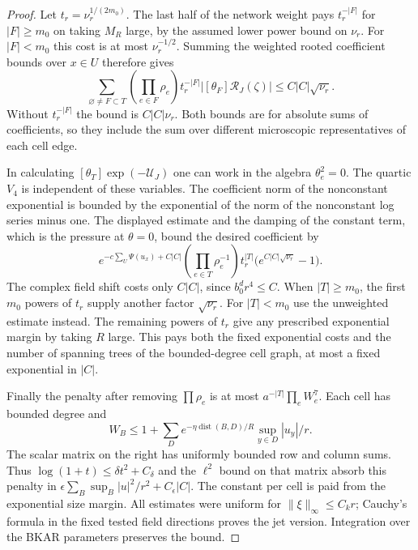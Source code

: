 \documentclass[11pt]{article}
\theoremstyle{definition}
\begin{document}
\begin{proof}
Let \(t_r=\nu_r^{1/(2m_0)}\). The last half of the network
weight pays \(t_r^{-|F|}\) for \(|F|\ge m_0\) on taking
\(M_R\) large, by the assumed lower power bound on \(\nu_r\).
For \(|F|<m_0\) this cost is at most \(\nu_r^{-1/2}\).
Summing the weighted rooted coefficient bounds over \(x\in U\)
therefore gives
\begin{equation}
 \sum_{\varnothing\ne F\subset T}
  \left(\prod_{e\in F}\rho_e\right)t_r^{-|F|}
          |[\theta_F]\mathcal R_J(\zeta)|
       \le C |C|\sqrt{\nu_r}.
\end{equation}
Without \(t_r^{-|F|}\) the bound is \(C|C|\nu_r\).
Both bounds are for absolute sums of coefficients, so they
include the sum over different microscopic representatives
of each cell edge.

In calculating \([\theta_T]\exp(-\mathcal U_J)\) one can work
in the algebra \(\theta_e^2=0\). The quartic \(V_4\) is independent
of these variables. The coefficient norm of the nonconstant
exponential is bounded by the exponential of the norm of the
nonconstant log series minus one. The displayed estimate and
the damping of the constant term, which is the pressure at
\(\theta=0\), bound the desired coefficient by
\begin{equation}
 e^{-c\sum_U\Psi(u_x)+C|C|}
    \left(\prod_{e\in T}\rho_e^{-1}\right)
    t_r^{|T|}\bigl(e^{C|C|\sqrt{\nu_r}}-1\bigr).
\end{equation}
The complex field shift costs only \(C|C|\), since
\(b_0^d r^4\le C\). When \(|T|\ge m_0\), the first \(m_0\)
powers of \(t_r\) supply another factor \(\sqrt{\nu_r}\).
For \(|T|<m_0\) use the unweighted estimate instead.
The remaining powers of \(t_r\) give any prescribed exponential
margin by taking \(R\) large. This pays both the fixed exponential
costs and the number of spanning trees of the bounded-degree
cell graph, at most a fixed exponential in \(|C|\).

Finally the penalty after removing \(\prod\rho_e\) is at most
\(a^{-|T|}\prod_e W_e^7\). Each cell has bounded degree and
\begin{equation}
 W_B\le 1+\sum_D e^{-\eta\operatorname{dist}(B,D)/R}
                       \sup_{y\in D}|u_y|/r .
\end{equation}
The scalar matrix on the right has uniformly bounded row and
column sums. Thus \(\log(1+t)\le \delta t^2+C_\delta\) and
the \(\ell^2\) bound on that matrix absorb this penalty in
\(\epsilon\sum_B\sup_B|u|^2/r^2+C_\epsilon|C|\).
The constant per cell is paid from the exponential size margin.
All estimates were uniform for \(\|\xi\|_\infty\le C_k r\);
Cauchy's formula in the fixed tested field directions proves the
jet version. Integration over the BKAR parameters preserves the
bound.
\end{proof}
\end{document}
